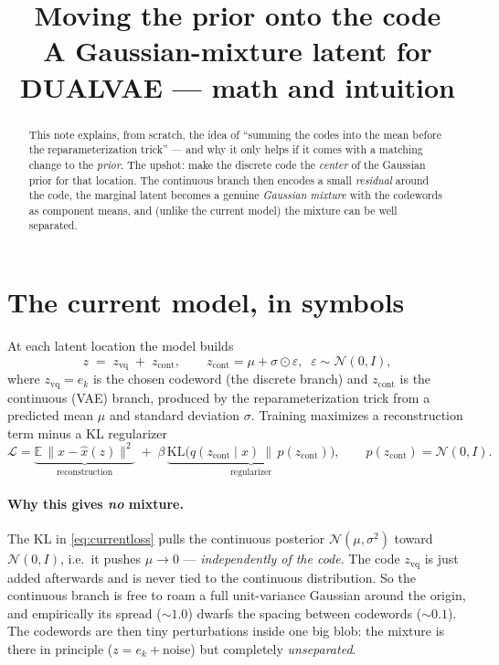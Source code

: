 \documentclass[11pt]{article}
\title{\textbf{Moving the prior onto the code}\\[2pt]
\large A Gaussian-mixture latent for DUALVAE --- math and intuition}
\author{}
\date{}
\newcommand{\N}{\mathcal{N}}
\newcommand{\zvq}{z_{\text{vq}}}
\newcommand{\zc}{z_{\text{cont}}}
\begin{document}
\maketitle
\vspace{-2.3em}

\begin{abstract}
\noindent
This note explains, from scratch, the idea of ``summing the codes into the mean before the
reparameterization trick'' --- and why it only helps if it comes with a matching change to the
\emph{prior}. The upshot: make the discrete code the \emph{center} of the Gaussian prior for
that location. The continuous branch then encodes a small \emph{residual} around the code, the
marginal latent becomes a genuine \emph{Gaussian mixture} with the codewords as component means,
and (unlike the current model) the mixture can be well separated.
\end{abstract}

\section{The current model, in symbols}
At each latent location the model builds
\begin{equation}
z \;=\; \zvq \;+\; \zc, \qquad
\zc = \mu + \sigma \odot \varepsilon,\;\; \varepsilon\sim\N(0,I),
\label{eq:current}
\end{equation}
where $\zvq=e_k$ is the chosen codeword (the discrete branch) and $\zc$ is the continuous
(VAE) branch, produced by the reparameterization trick from a predicted mean $\mu$ and standard
deviation $\sigma$. Training maximizes a reconstruction term minus a KL regularizer
\begin{equation}
\mathcal{L} = \underbrace{\mathbb{E}\,\|x-\hat{x}(z)\|^2}_{\text{reconstruction}}
\;+\; \beta\,\underbrace{\mathrm{KL}\!\big(q(\zc\mid x)\,\|\,p(\zc)\big)}_{\text{regularizer}},
\qquad p(\zc)=\N(0,I).
\label{eq:currentloss}
\end{equation}

\paragraph{Why this gives \emph{no} mixture.} The KL in \eqref{eq:currentloss} pulls the
continuous posterior $\N(\mu,\sigma^2)$ toward $\N(0,I)$, i.e.\ it pushes $\mu\to 0$ ---
\emph{independently of the code}. The code $\zvq$ is just added afterwards and is never tied to
the continuous distribution. So the continuous branch is free to roam a full unit-variance
Gaussian around the origin, and empirically its spread ($\sim\!1.0$) dwarfs the spacing between
codewords ($\sim\!0.1$). The codewords are then tiny perturbations inside one big blob: the
mixture is there in principle ($z=e_k+\text{noise}$) but completely \emph{unseparated}.
\end{document}
